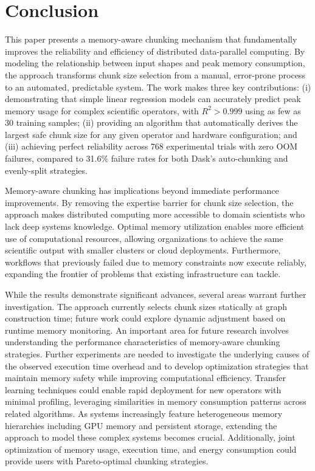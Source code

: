 \section{Conclusion}
\label{sec:conclusion}

This paper presents a memory-aware chunking mechanism that fundamentally improves the reliability and efficiency of distributed data-parallel computing.
By modeling the relationship between input shapes and peak memory consumption, the approach transforms chunk size selection from a manual, error-prone process to an automated, predictable system.
The work makes three key contributions: (i) demonstrating that simple linear regression models can accurately predict peak memory usage for complex scientific operators, with $R^2 > 0.999$ using as few as 30 training samples; (ii) providing an algorithm that automatically derives the largest safe chunk size for any given operator and hardware configuration; and (iii) achieving perfect reliability across 768 experimental trials with zero \ac{OOM} failures, compared to 31.6\% failure rates for both Dask's auto-chunking and evenly-split strategies.

Memory-aware chunking has implications beyond immediate performance improvements.
By removing the expertise barrier for chunk size selection, the approach makes distributed computing more accessible to domain scientists who lack deep systems knowledge.
Optimal memory utilization enables more efficient use of computational resources, allowing organizations to achieve the same scientific output with smaller clusters or cloud deployments.
Furthermore, workflows that previously failed due to memory constraints now execute reliably, expanding the frontier of problems that existing infrastructure can tackle.

While the results demonstrate significant advances, several areas warrant further investigation.
The approach currently selects chunk sizes statically at graph construction time; future work could explore dynamic adjustment based on runtime memory monitoring.
An important area for future research involves understanding the performance characteristics of memory-aware chunking strategies. Further experiments are needed to investigate the underlying causes of the observed execution time overhead and to develop optimization strategies that maintain memory safety while improving computational efficiency.
Transfer learning techniques could enable rapid deployment for new operators with minimal profiling, leveraging similarities in memory consumption patterns across related algorithms.
As systems increasingly feature heterogeneous memory hierarchies including \ac{GPU} memory and persistent storage, extending the approach to model these complex systems becomes crucial.
Additionally, joint optimization of memory usage, execution time, and energy consumption could provide users with Pareto-optimal chunking strategies.


